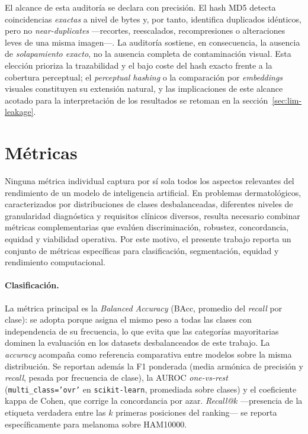 El alcance de esta auditoría se declara con precisión. El hash MD5
detecta coincidencias \emph{exactas} a nivel de bytes y, por tanto,
identifica duplicados idénticos, pero no \emph{near-duplicates}
---recortes, reescalados, recompresiones o alteraciones leves de una
misma imagen---. La auditoría sostiene, en consecuencia, la ausencia
de \emph{solapamiento exacto}, no la ausencia completa de
contaminación visual. Esta elección prioriza la trazabilidad y el bajo
coste del hash exacto frente a la cobertura perceptual; el
\emph{perceptual hashing} o la comparación por \emph{embeddings}
visuales constituyen su extensión natural, y las implicaciones de este
alcance acotado para la interpretación de los resultados se retoman en
la sección~\ref{sec:lim-leakage}.

\section{Métricas}
\label{sec:metricas}

Ninguna métrica individual captura por sí sola todos los aspectos
relevantes del rendimiento de un modelo de inteligencia artificial.
En problemas dermatológicos, caracterizados por distribuciones de
clases desbalanceadas, diferentes niveles de granularidad
diagnóstica y requisitos clínicos diversos, resulta necesario
combinar métricas complementarias que evalúen discriminación,
robustez, concordancia, equidad y viabilidad operativa. Por este
motivo, el presente trabajo reporta un conjunto de métricas
específicas para clasificación, segmentación, equidad y rendimiento
computacional.

\paragraph{Clasificación.}
La métrica principal es la \emph{Balanced Accuracy} (BAcc, promedio
del \emph{recall} por clase): se adopta porque asigna el mismo peso
a todas las clases con independencia de su frecuencia, lo que evita
que las categorías mayoritarias dominen la evaluación en los
datasets desbalanceados de este trabajo. La \emph{accuracy} acompaña
como referencia comparativa
entre modelos sobre la misma distribución. Se reportan además la F1
ponderada (media armónica de precisión y \emph{recall}, pesada por
frecuencia de clase), la AUROC \emph{one-vs-rest}
(\texttt{multi\_class='ovr'} en \texttt{scikit-learn}, promediada
sobre clases) y el coeficiente kappa de Cohen, que corrige la
concordancia por azar. \emph{Recall@$k$} —presencia de la etiqueta
verdadera entre las $k$ primeras posiciones del ranking— se reporta
específicamente para melanoma sobre HAM10000.

